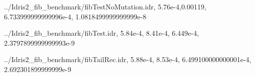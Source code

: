 \documentclass[
]{article}
\newenvironment{Shaded}{}{}
\newcommand{\DataTypeTok}[1]{\textcolor[rgb]{0.56,0.13,0.00}{#1}}
\newcommand{\FloatTok}[1]{\textcolor[rgb]{0.25,0.63,0.44}{#1}}
\newcommand{\NormalTok}[1]{#1}
\newcommand{\OperatorTok}[1]{\textcolor[rgb]{0.40,0.40,0.40}{#1}}
\begin{document}
\begin{Shaded}
\begin{Highlighting}[]
\OperatorTok{../}\DataTypeTok{Idris2\_fib\_benchmark}\OperatorTok{/}\NormalTok{fibTestNoMutation}\OperatorTok{.}\NormalTok{idr,}
\FloatTok{5.76e{-}4}\NormalTok{,}\FloatTok{0.00119}\NormalTok{,}
\FloatTok{6.733999999999996e{-}4}\NormalTok{,}
\FloatTok{1.0818499999999999e{-}8}

\OperatorTok{../}\DataTypeTok{Idris2\_fib\_benchmark}\OperatorTok{/}\NormalTok{fibTest}\OperatorTok{.}\NormalTok{idr,}
\FloatTok{5.84e{-}4}\NormalTok{,}
\FloatTok{8.41e{-}4}\NormalTok{,}
\FloatTok{6.449e{-}4}\NormalTok{,}
\FloatTok{2.3797899999999993e{-}9}

\OperatorTok{../}\DataTypeTok{Idris2\_fib\_benchmark}\OperatorTok{/}\NormalTok{fibTailRec}\OperatorTok{.}\NormalTok{idr,}
\FloatTok{5.88e{-}4}\NormalTok{,}
\FloatTok{8.53e{-}4}\NormalTok{,}
\FloatTok{6.499100000000001e{-}4}\NormalTok{,}
\FloatTok{2.692301899999999e{-}9}


\end{Highlighting}
\end{Shaded}
\end{document}
